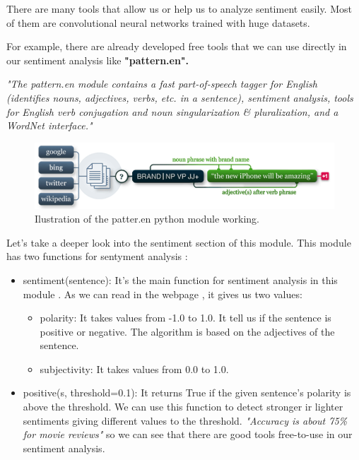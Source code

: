 \documentclass[12pt,twoside]{article}
\theoremstyle{plain}
\theoremstyle{definition}
\theoremstyle{remark}
\begin{document}
		There are many tools that allow us or help us to analyze sentiment easily. Most of them are convolutional neural networks trained with huge datasets.
	
		For example, there are already developed free tools that we can use directly in our sentiment analysis like \textbf{"pattern.en".}
		
		\begin{center}
			\textit{"The pattern.en module contains a fast part-of-speech tagger for English (identifies nouns, adjectives, verbs, etc. in a sentence), sentiment analysis, tools for English verb conjugation and noun singularization \& pluralization, and a WordNet interface."} \cite{python_module}
		\end{center}
		
		\begin{figure}[H]
			\centering
			\includegraphics[scale=0.8]{./Pictures/python_module.png}
			\caption{Ilustration of the patter.en python module working.} 
		\end{figure}
	
		Let's take a deeper look into the sentiment section of this module. This module has two functions for sentyment analysis \cite{python_module_sentiment}:
		
		\begin{itemize}
			\item sentiment(sentence): It's the main function for sentiment analysis in this module . As we can read in the webpage \cite{python_module_sentiment}, it gives us two values:
			
			\begin{itemize}
				\item polarity: It takes values from -1.0 to 1.0. It tell us if the sentence is positive or negative. The algorithm is based on the adjectives of the sentence.
				\item subjectivity: It takes values from 0.0 to 1.0.
			\end{itemize}
			
			\item positive(s, threshold=0.1): It returns True if the given sentence's polarity is above the threshold. We can use this function to detect stronger ir lighter sentiments giving different values to the threshold. \textit{"Accuracy is about 75\% for movie reviews" }\cite{python_module_sentiment} so we can see that there are good tools free-to-use in our sentiment analysis. 
		\end{itemize}
		
\end{document}
